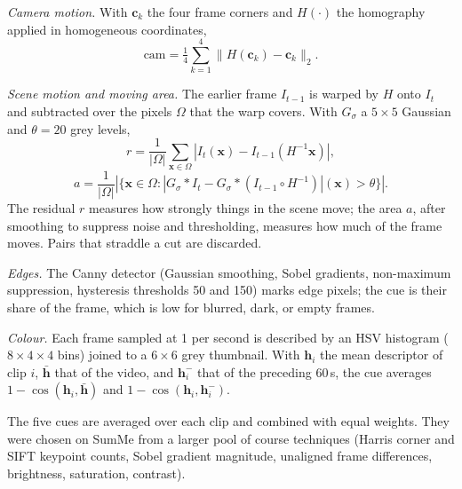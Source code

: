 \documentclass[conference]{IEEEtran}
\begin{document}
\emph{Camera motion.} With $\mathbf{c}_k$ the four frame corners and $H(\cdot)$ the homography applied in homogeneous coordinates,
\begin{equation}
\text{cam} = \tfrac{1}{4} \textstyle\sum_{k=1}^{4} \lVert H(\mathbf{c}_k) - \mathbf{c}_k \rVert_2 .
\end{equation}

\emph{Scene motion and moving area.} The earlier frame $I_{t-1}$ is warped by $H$ onto $I_t$ and subtracted over the pixels $\Omega$ that the warp covers. With $G_\sigma$ a $5 \times 5$ Gaussian and $\theta = 20$ grey levels,
\begin{equation}
r = \frac{1}{|\Omega|} \sum_{\mathbf{x} \in \Omega} \left| I_t(\mathbf{x}) - I_{t-1}(H^{-1}\mathbf{x}) \right| ,
\end{equation}
\begin{equation}
a = \frac{1}{|\Omega|} \left| \{ \mathbf{x} \in \Omega : | G_\sigma * I_t - G_\sigma * (I_{t-1} \circ H^{-1}) | (\mathbf{x}) > \theta \} \right| .
\end{equation}
The residual $r$ measures how strongly things in the scene move; the area $a$, after smoothing to suppress noise and thresholding, measures how much of the frame moves. Pairs that straddle a cut are discarded.

\emph{Edges.} The Canny detector (Gaussian smoothing, Sobel gradients, non-maximum suppression, hysteresis thresholds 50 and 150) marks edge pixels; the cue is their share of the frame, which is low for blurred, dark, or empty frames.

\emph{Colour.} Each frame sampled at 1 per second is described by an HSV histogram ($8 \times 4 \times 4$ bins) joined to a $6 \times 6$ grey thumbnail. With $\mathbf{h}_i$ the mean descriptor of clip $i$, $\bar{\mathbf{h}}$ that of the video, and $\mathbf{h}_i^{-}$ that of the preceding 60\,s, the cue averages $1 - \cos(\mathbf{h}_i, \bar{\mathbf{h}})$ and $1 - \cos(\mathbf{h}_i, \mathbf{h}_i^{-})$.

The five cues are averaged over each clip and combined with equal weights. They were chosen on SumMe from a larger pool of course techniques (Harris corner and SIFT keypoint counts, Sobel gradient magnitude, unaligned frame differences, brightness, saturation, contrast).
\end{document}
